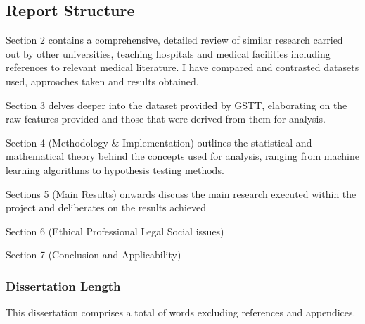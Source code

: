 \subsection{Report Structure}
\par{ \noindent Section 2 contains a comprehensive, detailed review of similar research carried out by other universities, teaching hospitals and medical facilities including references to relevant medical literature. I have compared and contrasted datasets used, approaches taken and results obtained.}
\par{\noindent Section 3 delves deeper into the dataset provided by GSTT, elaborating on the raw features provided and those that were derived from them for analysis.}
\par{\noindent Section 4 (Methodology \& Implementation) outlines the statistical and mathematical theory behind the concepts used for analysis, ranging from machine learning algorithms to hypothesis testing methods.}
\par{\noindent Sections 5 (Main Results) onwards discuss the main research executed within the project and deliberates on the results achieved}
\par{\noindent Section 6 (Ethical Professional Legal Social issues) }
\par{\noindent Section 7 (Conclusion and Applicability) }



\subsubsection{Dissertation Length}
This dissertation comprises a total of  words excluding references and appendices.





